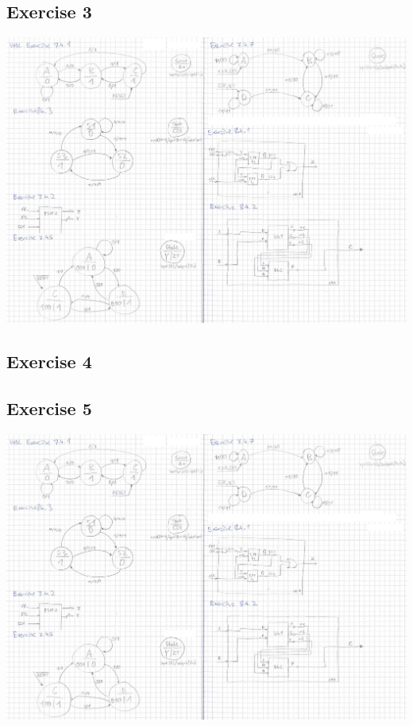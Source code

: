 \subsection*{Exercise 3}
\includegraphics[width=\textwidth, clip, trim={319 1045 1581 610}]{pics/solutions/chapter7+8_draft.jpg}

\subsection*{Exercise 4}

\subsection*{Exercise 5}
\includegraphics[width=\textwidth, clip, trim={184 13 1631 1571}]{pics/solutions/chapter7+8_draft.jpg}

